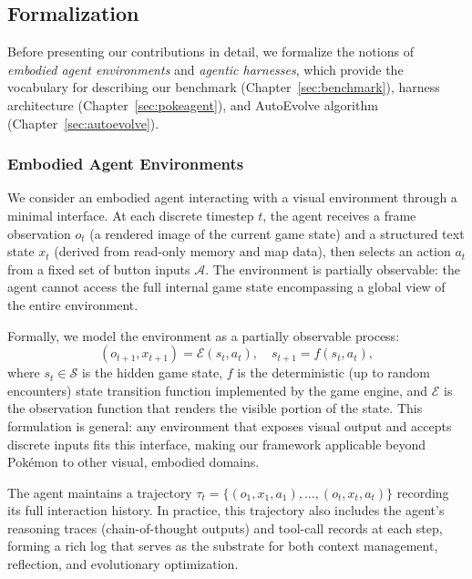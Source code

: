
\subsection{Formalization}\label{sec:formalization}

Before presenting our contributions in detail, we formalize the notions of \emph{embodied agent environments} and \emph{agentic harnesses}, which provide the vocabulary for describing our benchmark (Chapter~\ref{sec:benchmark}), harness architecture (Chapter~\ref{sec:pokeagent}), and AutoEvolve algorithm (Chapter~\ref{sec:autoevolve}).

\subsubsection{Embodied Agent Environments}\label{sec:formal_env}

We consider an embodied agent interacting with a visual environment through a minimal interface. At each discrete timestep $t$, the agent receives a frame observation $o_t$ (a rendered image of the current game state) and a structured text state $x_t$ (derived from read-only memory and map data), then selects an action $a_t$ from a fixed set of button inputs $\mathcal{A}$. The environment is partially observable: the agent cannot access the full internal game state encompassing a global view of the entire environment.

Formally, we model the environment as a partially observable process:
\begin{equation}\label{eq:env}
    (o_{t+1}, x_{t+1}) = \mathcal{E}(s_t, a_t), \quad s_{t+1} = f(s_t, a_t),
\end{equation}
where $s_t \in \mathcal{S}$ is the hidden game state, $f$ is the deterministic (up to random encounters) state transition function implemented by the game engine, and $\mathcal{E}$ is the observation function that renders the visible portion of the state. This formulation is general: any environment that exposes visual output and accepts discrete inputs fits this interface, making our framework applicable beyond Pok\'{e}mon to other visual, embodied domains.

The agent maintains a trajectory $\tau_t = \{(o_1, x_1, a_1), \ldots, (o_t, x_t, a_t)\}$ recording its full interaction history. In practice, this trajectory also includes the agent's reasoning traces (chain-of-thought outputs) and tool-call records at each step, forming a rich log that serves as the substrate for both context management, reflection, and evolutionary optimization.

